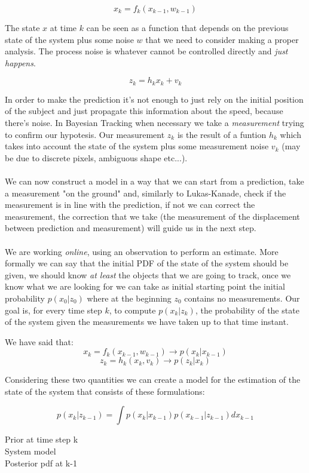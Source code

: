 \[
    x_k = f_k(x_{k-1}, w_{k-1})
\]

The state $x$ at time $k$ can be seen as a function that depends on the previous state of the system plus some noise $w$ that we need to consider making a proper analysis. The process noise is whatever cannot be controlled directly and \textit{just happens}.

\[
    z_k = h_k x_k + v_k
\]

In order to make the prediction it's not enough to just rely on the initial position of the subject and just propagate this information about the speed, because there's noise. In Bayesian Tracking when necessary we take a \textit{measurement} trying to confirm our hypotesis. Our measurement $z_k$ is the result of a funtion $h_k$ which takes into account the state of the system plus some measurement noise $v_k$ (may be due to discrete pixels, ambiguous shape etc...).
\\
\\
We can now construct a model in a way that we can start from a prediction, take a measurement "on the ground" and, similarly to Lukas-Kanade, check if the measurement is in line with the prediction, if not we can correct the measurement, the correction that we take (the measurement of the displacement between prediction and measurement) will guide us in the next step.
\\
\\
We are working \textit{online}, using an observation to perform an estimate. More formally we can say that the initial PDF of the state of the system should be given, we should know \textit{at least} the objects that we are going to track, once we know what we are looking for we can take as initial starting point the initial probability $p(x_0|z_0)$ where at the beginning $z_0$ contains no measurements. Our goal is,  for every time step $k$, to compute $p(x_k|z_k)$, the probability of the state of the system given the measurements we have taken up to that time instant.


We have said that:
\[
    x_k = f_k(x_{k-1}, w_{k-1}) \rightarrow p(x_k|x_{k-1})
\]
\[
    z_k = h_k(x_k, v_k) \rightarrow p(z_k|x_k)
\]

Considering these two quantities we can create a model for the estimation of the state of the system that consists of these formulations:

\[
    p(x_k|z_{k-1}) = \int p(x_k|x_{k-1})p(x_{k-1}|z_{k-1})dx_{k-1}
\]

\begin{multicols}{3}
    Prior at time step k\\
    System model\\
    Posterior pdf at k-1
\end{multicols}

